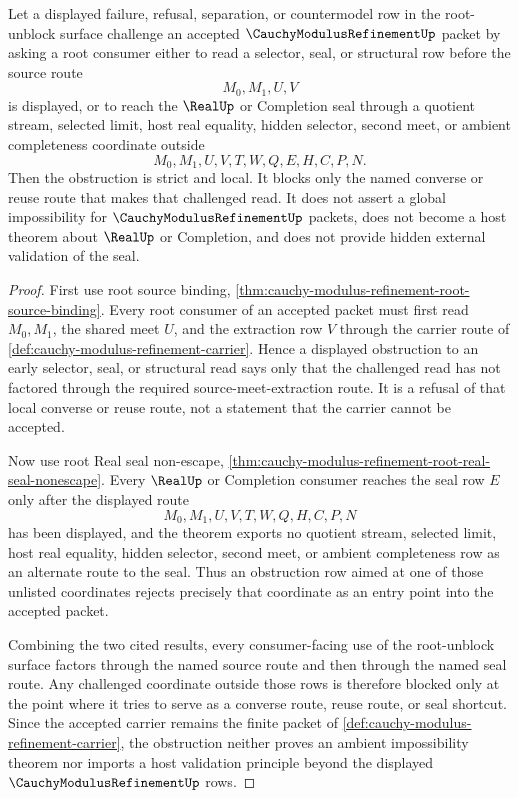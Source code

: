 \begin{corollary}
\label{cor:cauchy-modulus-refinement-root-source-binding-strict-obstruction}
Let a displayed failure, refusal, separation, or countermodel row in the root-unblock surface challenge an accepted $\CauchyModulusRefinementUp$ packet by asking a root consumer either to read a selector, seal, or structural row before the source route
$$
M_0,M_1,U,V
$$
is displayed, or to reach the $\RealUp$ or Completion seal through a quotient stream, selected limit, host real equality, hidden selector, second meet, or ambient completeness coordinate outside
$$
M_0,M_1,U,V,T,W,Q,E,H,C,P,N.
$$
Then the obstruction is strict and local. It blocks only the named converse or reuse route that makes that challenged read. It does not assert a global impossibility for $\CauchyModulusRefinementUp$ packets, does not become a host theorem about $\RealUp$ or Completion, and does not provide hidden external validation of the seal.
\end{corollary}
\begin{proof}
First use root source binding, \autoref{thm:cauchy-modulus-refinement-root-source-binding}. Every root consumer of an accepted packet must first read $M_0,M_1$, the shared meet $U$, and the extraction row $V$ through the carrier route of \autoref{def:cauchy-modulus-refinement-carrier}. Hence a displayed obstruction to an early selector, seal, or structural read says only that the challenged read has not factored through the required source-meet-extraction route. It is a refusal of that local converse or reuse route, not a statement that the carrier cannot be accepted.

Now use root Real seal non-escape, \autoref{thm:cauchy-modulus-refinement-root-real-seal-nonescape}. Every $\RealUp$ or Completion consumer reaches the seal row $E$ only after the displayed route
$$
M_0,M_1,U,V,T,W,Q,H,C,P,N
$$
has been displayed, and the theorem exports no quotient stream, selected limit, host real equality, hidden selector, second meet, or ambient completeness row as an alternate route to the seal. Thus an obstruction row aimed at one of those unlisted coordinates rejects precisely that coordinate as an entry point into the accepted packet.

Combining the two cited results, every consumer-facing use of the root-unblock surface factors through the named source route and then through the named seal route. Any challenged coordinate outside those rows is therefore blocked only at the point where it tries to serve as a converse route, reuse route, or seal shortcut. Since the accepted carrier remains the finite packet of \autoref{def:cauchy-modulus-refinement-carrier}, the obstruction neither proves an ambient impossibility theorem nor imports a host validation principle beyond the displayed $\CauchyModulusRefinementUp$ rows.
\end{proof}

